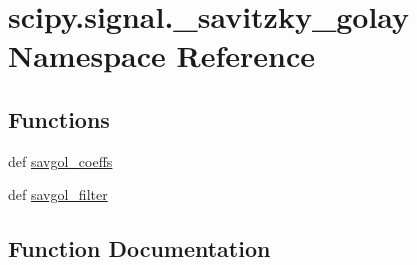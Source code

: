 \hypertarget{namespacescipy_1_1signal_1_1__savitzky__golay}{}\section{scipy.\+signal.\+\_\+savitzky\+\_\+golay Namespace Reference}
\label{namespacescipy_1_1signal_1_1__savitzky__golay}
\subsection*{Functions}
\begin{DoxyCompactItemize}
\item 
def \hyperlink{namespacescipy_1_1signal_1_1__savitzky__golay_a14059eaa7463019b5c137c6722cb93f6}{savgol\+\_\+coeffs}
\item 
def \hyperlink{namespacescipy_1_1signal_1_1__savitzky__golay_a695e7ebdb5efff61216a14bb20a0e980}{savgol\+\_\+filter}
\end{DoxyCompactItemize}


\subsection{Function Documentation}
\hypertarget{namespacescipy_1_1signal_1_1__savitzky__golay_a14059eaa7463019b5c137c6722cb93f6}{}

